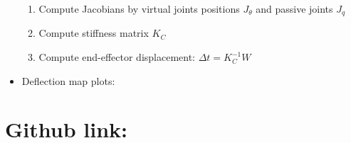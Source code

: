 \documentclass[12pt]{article}
\begin{document}
\begin{itemize}
\begin{enumerate}
			\item Compute Jacobians by virtual joints positions $J_\theta$ and passive joints $J_q$
			
			\item Compute stiffness matrix $K_C$
			
			\item Compute end-effector displacement: $\Delta t = K_C^{-1}W$
			
		\end{enumerate} 
		\item Deflection map plots: 
		
	\end{itemize}

	\section{Github link:} 
\end{document}
